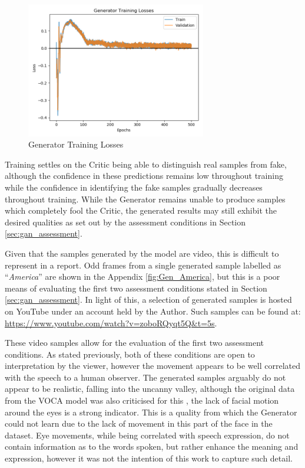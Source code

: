 \begin{figure}[h!]
    \centering
        \includegraphics[width=0.7\textwidth]{figures/gan/gen_train_losses.png}
    \caption{Generator Training Losses}\label{fig:gen_train_losses}
\end{figure} 

Training settles on the Critic being able to distinguish real samples from fake, although the confidence in these predictions remains low throughout training while the confidence in identifying the fake samples gradually decreases throughout training. 
While the Generator remains unable to produce samples which completely fool the Critic, the generated results may still exhibit the desired qualities as set out by the assessment conditions in Section \ref{sec:gan_assessment}.

Given that the samples generated by the model are video, this is difficult to represent in a report.
Odd frames from a single generated sample labelled as ``\textit{America}'' are shown in the Appendix \ref{fig:Gen_America}, but this is a poor means of evaluating the first two assessment conditions stated in Section \ref{sec:gan_assessment}.
In light of this, a selection of generated samples is hosted on YouTube under an account held by the Author. 
Such samples can be found at: \url{https://www.youtube.com/watch?v=zoboRQyqt5Q&t=5s}.

These video samples allow for the evaluation of the first two assessment conditions.
As stated previously, both of these conditions are open to interpretation by the viewer, however the movement appears to be well correlated with the speech to a human observer.
The generated samples arguably do not appear to be realistic, falling into the uncanny valley, although the original data from the VOCA model was also criticised for this \cite{Cudeiro2019}, the lack of facial motion around the eyes is a strong indicator.
This is a quality from which the Generator could not learn due to the lack of movement in this part of the face in the dataset.
Eye movements, while being correlated with speech expression, do not contain information as to the words spoken, but rather enhance the meaning and expression, however it was not the intention of this work to capture such detail.

